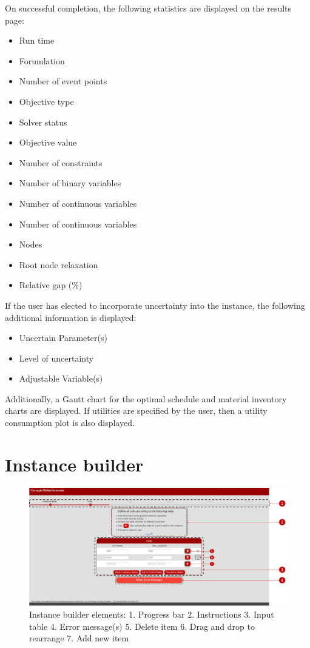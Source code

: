 On successful completion, the following statistics are displayed on the results page:
\begin{itemize}
\item Run time
\item Forumlation
\item Number of event points
\item Objective type
\item Solver status
\item Objective value
\item Number of constraints
\item Number of binary variables
\item Number of continuous variables
\item Number of continuous variables
\item Nodes
\item Root node relaxation
\item Relative gap (\%)
\end{itemize}

If the user has elected to incorporate uncertainty into the instance, the following additional information is displayed:
\begin{itemize}
\item Uncertain Parameter(s)
\item Level of uncertainty
\item Adjustable Variable(s)
\end{itemize}

Additionally, a Gantt chart for the optimal schedule and material inventory charts are displayed. If utilities are specified by the user, then a utility consumption plot is also displayed.

\section{Instance builder}

\begin{figure}[htbp]
\centering
\includegraphics[width=\linewidth]{Images/GUIDesign.png}
\caption[Instance builder elements]{Instance builder elements:
1. Progress bar
2. Instructions
3. Input table
4. Error message(s)
5. Delete item 
6. Drag and drop to rearrange
7. Add new item}
\label{fig:IBGUI}
\end{figure}

